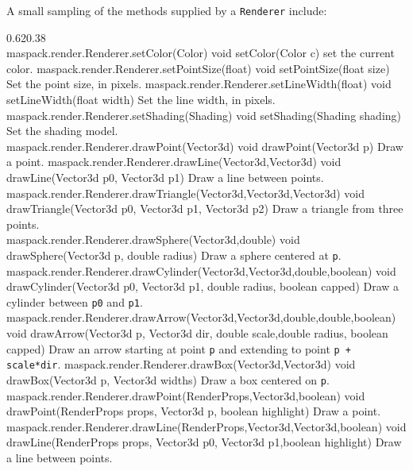 A small sampling of the methods supplied by a {\tt Renderer} include:
%
\begin{methodtable}{0.62}{0.38}
\midline
{}\\
\midline
%
\methodentry
{maspack.render.Renderer.setColor(Color)}%
{void setColor(Color c)}%
{set the current color.}%
%
\methodentry
{maspack.render.Renderer.setPointSize(float)}%
{void setPointSize(float size)}%
{Set the point size, in pixels.}%
%
\methodentry
{maspack.render.Renderer.setLineWidth(float)}%
{void setLineWidth(float width)}%
{Set the line width, in pixels.}%
%
\methodentry
{maspack.render.Renderer.setShading(Shading)}%
{void setShading(Shading shading)}%
{Set the shading model.}%
%
\midline
{}\\
\midline
%
\methodentry
{maspack.render.Renderer.drawPoint(Vector3d)}%
{void drawPoint(Vector3d p)}%
{Draw a point.}%
%
\methodentry
{maspack.render.Renderer.drawLine(Vector3d,Vector3d)}%
{void drawLine(Vector3d p0, Vector3d p1)}%
{Draw a line between points.}%
%
\methodentry
{maspack.render.Renderer.drawTriangle(Vector3d,Vector3d,Vector3d)}%
{void drawTriangle(Vector3d p0, Vector3d p1, Vector3d p2)}%
{Draw a triangle from three points.}%
%
\midline
{}\\
\midline
%
\methodentry
{maspack.render.Renderer.drawSphere(Vector3d,double)}%
{void drawSphere(Vector3d p, double radius)}%
{Draw a sphere centered at {\tt p}.}%
%
\methodentry
{maspack.render.Renderer.drawCylinder(Vector3d,Vector3d,double,boolean)}%
{void drawCylinder(Vector3d p0, Vector3d p1, double radius, \brh boolean capped)}%
{Draw a cylinder between {\tt p0} and {\tt p1}.}%
%
\methodentry
{maspack.render.Renderer.drawArrow(Vector3d,Vector3d,double,double,boolean)}%
{void drawArrow(Vector3d p, Vector3d dir, double scale,\brh double radius, boolean capped)}%
{Draw an arrow starting at point {\tt p} and extending to point {\tt p + scale*dir}.}%
%
\methodentry
{maspack.render.Renderer.drawBox(Vector3d,Vector3d)}%
{void drawBox(Vector3d p, Vector3d widths)}%
{Draw a box centered on {\tt p}.}%
%
\midline
{}\\
\midline
%
\methodentry
{maspack.render.Renderer.drawPoint(RenderProps,Vector3d,boolean)}%
{void drawPoint(RenderProps props, Vector3d p, boolean highlight)}%
{Draw a point.}%
\methodentry
{maspack.render.Renderer.drawLine(RenderProps,Vector3d,Vector3d,boolean)}%
{void drawLine(RenderProps props, Vector3d p0, Vector3d p1,\brh boolean highlight)}%
{Draw a line between points.}%
%
\midline
\end{methodtable}
%

